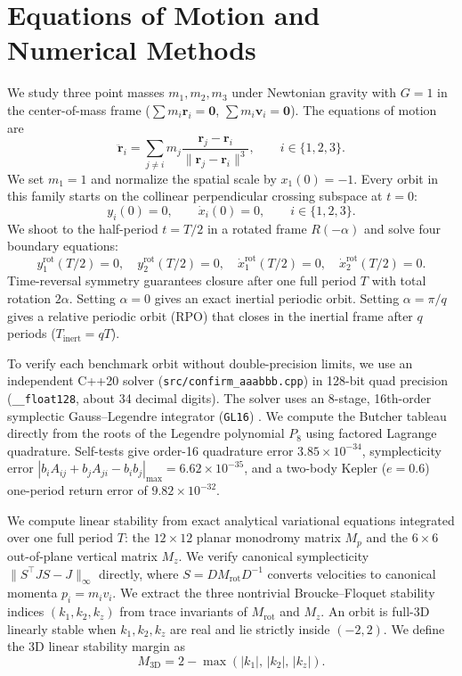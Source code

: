 \documentclass[11pt,a4paper]{article}
\begin{document}
\section{Equations of Motion and Numerical Methods}
We study three point masses $m_1, m_2, m_3$ under Newtonian gravity with $G = 1$ in the center-of-mass frame ($\sum m_i \mathbf{r}_i = \mathbf{0}$, $\sum m_i \mathbf{v}_i = \mathbf{0}$).
The equations of motion are
\begin{equation}
\ddot{\mathbf{r}}_i = \sum_{j \neq i} m_j \frac{\mathbf{r}_j - \mathbf{r}_i}{\|\mathbf{r}_j - \mathbf{r}_i\|^3}, \qquad i \in \{1, 2, 3\}.
\end{equation}
We set $m_1 = 1$ and normalize the spatial scale by $x_1(0) = -1$.
Every orbit in this family starts on the collinear perpendicular crossing subspace at $t = 0$:
\begin{equation}
y_i(0) = 0, \qquad \dot{x}_i(0) = 0, \qquad i \in \{1, 2, 3\}.
\end{equation}
We shoot to the half-period $t = T/2$ in a rotated frame $R(-\alpha)$ and solve four boundary equations:
\begin{equation}
y_1^{\text{rot}}(T/2) = 0, \quad y_2^{\text{rot}}(T/2) = 0, \quad \dot{x}_1^{\text{rot}}(T/2) = 0, \quad \dot{x}_2^{\text{rot}}(T/2) = 0.
\end{equation}
Time-reversal symmetry guarantees closure after one full period $T$ with total rotation $2\alpha$.
Setting $\alpha = 0$ gives an exact inertial periodic orbit.
Setting $\alpha = \pi/q$ gives a relative periodic orbit (RPO) that closes in the inertial frame after $q$ periods ($T_{\text{inert}} = qT$).

To verify each benchmark orbit without double-precision limits, we use an independent C++20 solver (\texttt{src/confirm\_aaabbb.cpp}) in 128-bit quad precision (\texttt{\_\_float128}, about 34 decimal digits).
The solver uses an 8-stage, 16th-order symplectic Gauss--Legendre integrator (\texttt{GL16}) \cite{Hairer2006}.
We compute the Butcher tableau directly from the roots of the Legendre polynomial $P_8$ using factored Lagrange quadrature.
Self-tests give order-16 quadrature error $3.85 \times 10^{-34}$, symplecticity error $|b_i A_{ij} + b_j A_{ji} - b_i b_j|_{\max} = 6.62 \times 10^{-35}$, and a two-body Kepler ($e = 0.6$) one-period return error of $9.82 \times 10^{-32}$.

We compute linear stability from exact analytical variational equations integrated over one full period $T$: the $12 \times 12$ planar monodromy matrix $M_p$ and the $6 \times 6$ out-of-plane vertical matrix $M_z$.
We verify canonical symplecticity $\|S^\top J S - J\|_\infty$ directly, where $S = D M_{\text{rot}} D^{-1}$ converts velocities to canonical momenta $p_i = m_i v_i$.
We extract the three nontrivial Broucke--Floquet stability indices $(k_1, k_2, k_z)$ from trace invariants of $M_{\text{rot}}$ and $M_z$.
An orbit is full-3D linearly stable when $k_1, k_2, k_z$ are real and lie strictly inside $(-2, 2)$.
We define the 3D linear stability margin as
\begin{equation}
M_{3\text{D}} = 2 - \max(|k_1|,\, |k_2|,\, |k_z|).
\end{equation}
\end{document}
